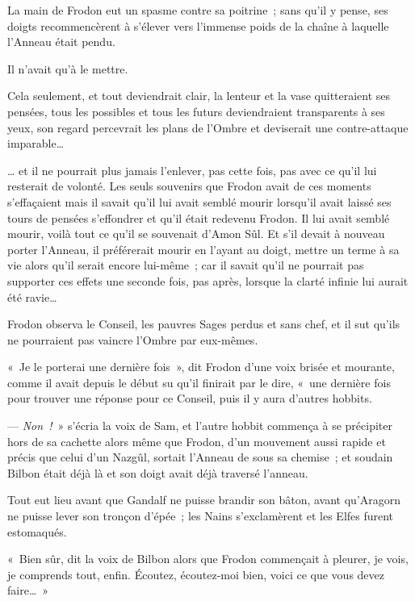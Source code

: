 La main de Frodon eut un spasme contre sa poitrine~; sans qu'il y pense, ses doigts recommencèrent à s'élever vers l'immense poids de la chaîne à laquelle l'Anneau était pendu.

Il n'avait qu'à le mettre.

Cela seulement, et tout deviendrait clair, la lenteur et la vase quitteraient ses pensées, tous les possibles et tous les futurs deviendraient transparents à ses yeux, son regard percevrait les plans de l'Ombre et deviserait une contre-attaque imparable…

… et il ne pourrait plus jamais l'enlever, pas cette fois, pas avec ce qu'il lui resterait de volonté.
Les seuls souvenirs que Frodon avait de ces moments s'effaçaient mais il savait qu'il lui avait semblé mourir lorsqu'il avait laissé ses tours de pensées s'effondrer et qu'il était redevenu Frodon.
Il lui avait semblé mourir, voilà tout ce qu'il se souvenait d'Amon Sûl.
Et s'il devait à nouveau porter l'Anneau, il préférerait mourir en l'ayant au doigt, mettre un terme à sa vie alors qu'il serait encore lui-même~; car il savait qu'il ne pourrait pas supporter ces effets une seconde fois, pas après, lorsque la clarté infinie lui aurait été ravie…

Frodon observa le Conseil, les pauvres Sages perdus et sans chef, et il sut qu'ils ne pourraient pas vaincre l'Ombre par eux-mêmes.

«~Je le porterai une dernière fois~», dit Frodon d'une voix brisée et mourante, comme il avait depuis le début su qu'il finirait par le dire, «~une dernière fois pour trouver une réponse pour ce Conseil, puis il y aura d'autres hobbits.

--- \emph{Non~!}~» s'écria la voix de Sam, et l'autre hobbit commença à se précipiter hors de sa cachette alors même que Frodon, d'un mouvement aussi rapide et précis que celui d'un Nazgûl, sortait l'Anneau de sous sa chemise~; et soudain Bilbon était déjà là et son doigt avait déjà traversé l'anneau.

Tout eut lieu avant que Gandalf ne puisse brandir son bâton, avant qu'Aragorn ne puisse lever son tronçon d'épée~; les Nains s'exclamèrent et les Elfes furent estomaqués.

«~Bien sûr, dit la voix de Bilbon alors que Frodon commençait à pleurer, je vois, je comprends tout, enfin.
Écoutez, écoutez-moi bien, voici ce que vous devez faire…~»


